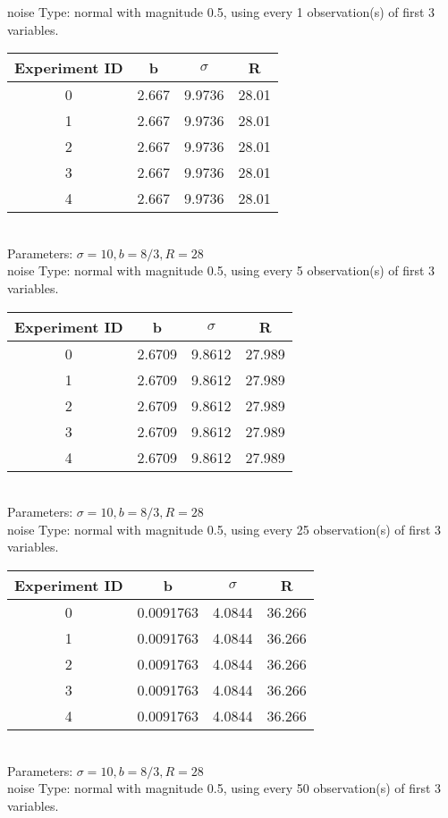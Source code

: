 \begin{multicols}{3}
noise Type: normal with magnitude 0.5, using every 1 observation(s) of first 3 variables.\\
\begin{tabular}{cccc}
\hline Experiment ID & b & $\sigma$ & R \\ \hline 
0 & 2.667 & 9.9736 & 28.01\\ \hline 
 1 & 2.667 & 9.9736 & 28.01\\ \hline 
 2 & 2.667 & 9.9736 & 28.01\\ \hline 
 3 & 2.667 & 9.9736 & 28.01\\ \hline 
 4 & 2.667 & 9.9736 & 28.01\\ \hline 
 \end{tabular}\\
Parameters: $\sigma=10, b=8/3, R=28$\\
noise Type: normal with magnitude 0.5, using every 5 observation(s) of first 3 variables.\\
\begin{tabular}{cccc}
\hline Experiment ID & b & $\sigma$ & R \\ \hline 
0 & 2.6709 & 9.8612 & 27.989\\ \hline 
 1 & 2.6709 & 9.8612 & 27.989\\ \hline 
 2 & 2.6709 & 9.8612 & 27.989\\ \hline 
 3 & 2.6709 & 9.8612 & 27.989\\ \hline 
 4 & 2.6709 & 9.8612 & 27.989\\ \hline 
 \end{tabular}\\
Parameters: $\sigma=10, b=8/3, R=28$\\
noise Type: normal with magnitude 0.5, using every 25 observation(s) of first 3 variables.\\
\begin{tabular}{cccc}
\hline Experiment ID & b & $\sigma$ & R \\ \hline 
0 & 0.0091763 & 4.0844 & 36.266\\ \hline 
 1 & 0.0091763 & 4.0844 & 36.266\\ \hline 
 2 & 0.0091763 & 4.0844 & 36.266\\ \hline 
 3 & 0.0091763 & 4.0844 & 36.266\\ \hline 
 4 & 0.0091763 & 4.0844 & 36.266\\ \hline 
 \end{tabular}\\
Parameters: $\sigma=10, b=8/3, R=28$\\
noise Type: normal with magnitude 0.5, using every 50 observation(s) of first 3 variables.\\

\end{multicols}
